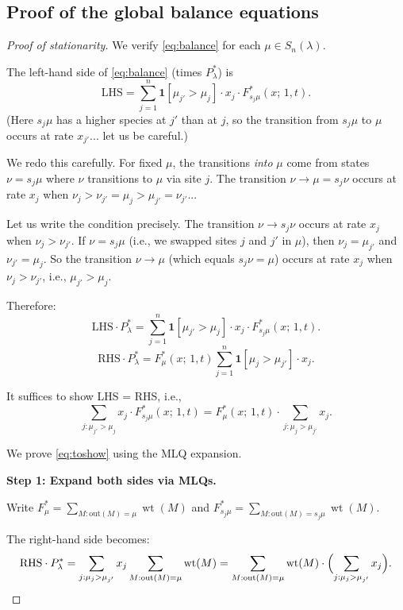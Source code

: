 \documentclass[12pt]{article}
\theoremstyle{definition}
\DeclareMathOperator{\wt}{wt}
\begin{document}
\subsection{Proof of the global balance equations}

\begin{proof}[Proof of stationarity]
We verify \eqref{eq:balance} for each $\mu \in S_n(\lambda)$.

The left-hand side of \eqref{eq:balance} (times $P^*_\lambda$) is
\[
  \mathrm{LHS} = \sum_{j=1}^n \mathbf{1}[\mu_{j'} > \mu_j] \cdot x_j \cdot F^*_{s_j\mu}(x;\,1,t).
\]
(Here $s_j\mu$ has a higher species at $j'$ than at $j$, so the transition from
$s_j\mu$ to $\mu$ occurs at rate $x_{j'}$... let us be careful.)

We redo this carefully.  For fixed $\mu$, the transitions \emph{into} $\mu$
come from states $\nu = s_j \mu$ where $\nu$ transitions to $\mu$ via site $j$.
The transition $\nu \to \mu = s_j \nu$ occurs at rate $x_j$ when $\nu_j >
\nu_{j'} = \mu_j > \mu_{j'} = \nu_{j'}$...

Let us write the condition precisely.  The transition $\nu \to s_j \nu$ occurs
at rate $x_j$ when $\nu_j > \nu_{j'}$.  If $\nu = s_j \mu$ (i.e., we swapped
sites $j$ and $j'$ in $\mu$), then $\nu_j = \mu_{j'}$ and $\nu_{j'} = \mu_j$.
So the transition $\nu \to \mu$ (which equals $s_j\nu = \mu$) occurs at rate
$x_j$ when $\nu_j > \nu_{j'}$, i.e., $\mu_{j'} > \mu_j$.

Therefore:
\[
  \mathrm{LHS} \cdot P^*_\lambda = \sum_{j=1}^n \mathbf{1}[\mu_{j'} > \mu_j]
  \cdot x_j \cdot F^*_{s_j\mu}(x;\,1,t).
\]
\[
  \mathrm{RHS} \cdot P^*_\lambda = F^*_\mu(x;\,1,t) \sum_{j=1}^n
  \mathbf{1}[\mu_j > \mu_{j'}] \cdot x_j.
\]

It suffices to show LHS = RHS, i.e.,
\begin{equation}\label{eq:toshow}
  \sum_{j : \mu_{j'} > \mu_j} x_j \cdot F^*_{s_j\mu}(x;\,1,t)
  = F^*_\mu(x;\,1,t) \cdot \sum_{j : \mu_j > \mu_{j'}} x_j.
\end{equation}

\medskip

We prove \eqref{eq:toshow} using the MLQ expansion.

\textbf{Step 1: Expand both sides via MLQs.}

Write $F^*_\mu = \sum_{M : \text{out}(M)=\mu} \wt(M)$ and
$F^*_{s_j\mu} = \sum_{M : \text{out}(M)=s_j\mu} \wt(M)$.

The right-hand side becomes:
\begin{equation}\label{eq:RHS_expand}
  \mathrm{RHS} \cdot P^*_\lambda
  = \sum_{j : \mu_j > \mu_{j'}} x_j \sum_{M : \text{out}(M)=\mu} \wt(M)
  = \sum_{M : \text{out}(M)=\mu} \wt(M) \cdot \Bigl(\sum_{j : \mu_j > \mu_{j'}} x_j\Bigr).
\end{equation}


\end{proof}
\end{document}
